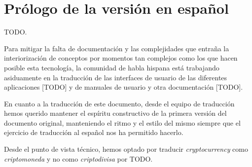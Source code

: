 \chapter*{Prólogo de la versión en español}
\label{chap:prologue}

TODO.

Para mitigar la falta de documentación y las complejidades que entraña la interiorización de conceptos por momentos tan complejos como los que hacen posible esta tecnología, la comunidad de habla hispana está trabajando asiduamente en la traducción de las interfaces de usuario de las diferentes aplicaciones [TODO] y de manuales de usuario y otra documentación [TODO].

En cuanto a la traducción de este documento, desde el equipo de traducción hemos querido mantener el espíritu constructivo de la primera versión del documento original, manteniendo el ritmo y el estilo del mismo siempre que el ejercicio de traducción al español nos ha permitido hacerlo.

Desde el punto de vista técnico, hemos optado por traducir \textit{cryptocurrency} como \textit{criptomoneda} y no como \textit{criptodivisa} por TODO.
